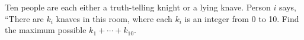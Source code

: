 Ten people are each either a truth-telling knight or a lying knave. Person $i$ says, ``There are $k_i$ knaves in this room, where each $k_i$ is an integer from 0 to 10. Find the maximum possible $k_1+\cdots+k_{10}$.
